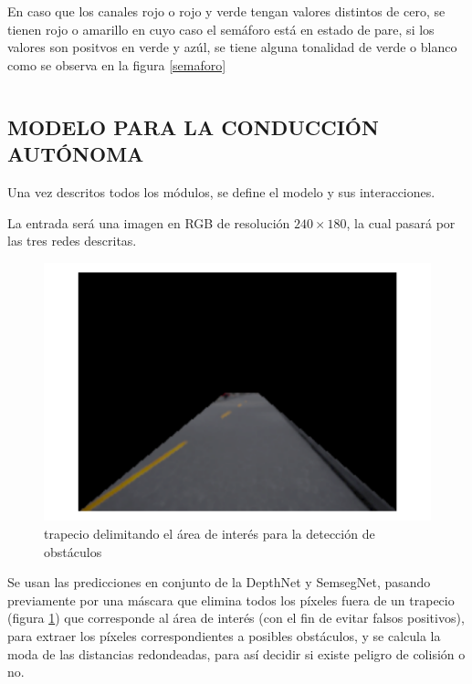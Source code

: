 		En caso que los canales rojo o rojo y verde tengan valores distintos de cero, se tienen rojo o amarillo en cuyo caso el semáforo está en estado de pare, si los valores son positvos en verde y azúl, se tiene alguna tonalidad de verde o blanco como se observa en la figura \ref{semaforo}
		
		\inputminted[frame=lines,
		baselinestretch=1,
		fontsize=\footnotesize,
		autogobble]{python}{codigos/marco-aplicativo/kmeans.py}
				
	\subsection{MODELO PARA LA CONDUCCIÓN AUTÓNOMA}
		Una vez descritos todos los módulos, se define el modelo y sus interacciones.
		
		La entrada será una imagen en RGB de resolución $240\times180$, la cual pasará por las tres redes descritas.
		
		\begin{figure}[H]
			\centering
			\includegraphics[scale=0.5]{imagenes/trapecio}
			\caption[Delimitado del área de interés para la detección de objetos]{trapecio delimitando el área de interés para la detección de obstáculos}
			\label{trapecio}
		\end{figure}
		
		Se usan las predicciones en conjunto de la DepthNet y SemsegNet, pasando previamente por una máscara que elimina todos los píxeles fuera de un trapecio (figura \ref{trapecio}) que corresponde al área de interés (con el fin de evitar falsos positivos), para extraer los píxeles correspondientes a posibles obstáculos, y se calcula la moda de las distancias redondeadas, para así decidir si existe peligro de colisión o no.
		
